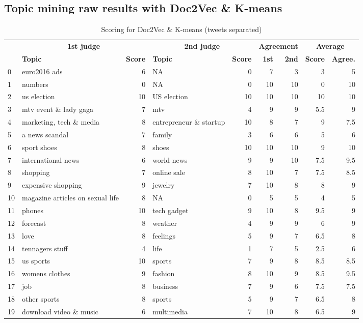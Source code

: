 \documentclass[11pt]{article}
\begin{document}
\begin{appendices}
\section{Topic mining raw results with Doc2Vec \& K-means}

\begin{table}[H]
	\centering
	\begin{tabular}{| l | p{2.7cm} | r | p{2.7cm} | r | r | r | r | r |}
		\hline
		& \multicolumn{2}{c|}{\textbf{1st judge}} & \multicolumn{2}{c|}{\textbf{2nd judge}} & \multicolumn{2}{c|}{\textbf{Agreement}} & \multicolumn{2}{c|}{\textbf{Average}}\\
        \cline{2-9}
         & \textbf{Topic} & \textbf{Score} & \textbf{Topic} & \textbf{Score} & \textbf{1st} & \textbf{2nd} & \textbf{Score} & \textbf{Agree.}\\
		\hline
            0 & euro2016 ads & 6 & NA & 0 & 7 & 3 & 3 & 5\\
            1 & numbers & 0 & NA & 0 & 10 & 10 & 0 & 10\\
            2 & us election & 10 & US election & 10 & 10 & 10 & 10 & 10\\
            3 & mtv event \& lady gaga & 7 & mtv & 4 & 9 & 9 & 5.5 & 9\\
            4 & marketing, tech \& media & 8 & entrepreneur \& startup & 10 & 8 & 7 & 9 & 7.5\\
            5 & a news scandal & 7 & family & 3 & 6 & 6 & 5 & 6\\
            6 & sport shoes & 8 & shoes & 10 & 10 & 10 & 9 & 10\\
            7 & international news & 6 & world news & 9 & 9 & 10 & 7.5 & 9.5\\
            8 & shopping & 7 & online sale & 8 & 10 & 7 & 7.5 & 8.5\\
            9 & expensive shopping & 9 & jewelry & 7 & 10 & 8 & 8 & 9\\
            10 & magazine articles on sexual life & 8 & NA & 0 & 5 & 5 & 4 & 5\\
            11 & phones & 10 & tech gadget & 9 & 10 & 8 & 9.5 & 9\\
            12 & forecast & 8 & weather & 4 & 9 & 9 & 6 & 9\\
            13 & love & 8 & feelings & 5 & 9 & 7 & 6.5 & 8\\
            14 & tennagers stuff & 4 & life & 1 & 7 & 5 & 2.5 & 6\\
            15 & us sports & 10 & sports & 7 & 9 & 8 & 8.5 & 8.5\\
            16 & womens clothes & 9 & fashion & 8 & 10 & 9 & 8.5 & 9.5\\
            17 & job & 8 & business & 7 & 9 & 6 & 7.5 & 7.5\\
            18 & other sports & 8 & sports & 5 & 9 & 7 & 6.5 & 8\\
            19 & download video \& music & 6 & multimedia & 7 & 10 & 8 & 6.5 & 9\\
		\hline
	\end{tabular}
	\caption{Scoring for Doc2Vec \& K-means (tweets separated)}
	\label{tb:res_doc_sep}
\end{table}


\end{appendices}
\end{document}

